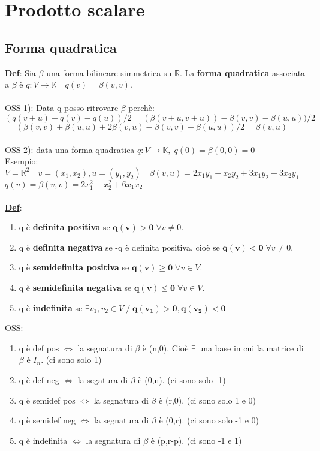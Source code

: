 \documentclass[12pt]{article}
\begin{document}
\section{Prodotto scalare}
\subsection{Forma quadratica}
\textbf{Def}: Sia $\beta$ una forma bilineare simmetrica su $\mathbb{R}$. La \textbf{forma quadratica} associata a $\beta$ è $q:V\longrightarrow \mathbb{K}\quad q(v) = \beta(v,v)$.\\\\
\underline{OSS 1)}: Data q posso ritrovare $\beta$ perchè:\\
$(q(v+u)-q(v)-q(u))/2 = (\beta(v+u,v+u))-\beta(v,v)-\beta(u,u))/2$\\
$=(\beta(v,v)+\beta(u,u) +2\beta(v,u)-\beta(v,v) - \beta(u,u))/2 = \beta(v,u)$\\\\
\underline{OSS 2)}: data una forma quadratica $q : V \longrightarrow \mathbb{K},\; q(\underline{0}) = \beta(\underline{0}, \underline{0}) = \underline{0}$\\

\noindent Esempio:\\
$V = \mathbb{R}^2\quad v = (x_1,x_2), u=(y_1,y_2)\quad \beta(v,u) = 2x_1y_1-x_2y_2+3x_1y_2+3x_2y_1$\\
$q(v) = \beta(v,v) = 2x_1^2-x_2^2 + 6x_1x_2$\\\\
\textbf{\underline{Def}}:
\begin{enumerate}
    \item q è \textbf{definita positiva} se $\boldsymbol{q(v)>0}\; \forall v\neq 0$.
    \item q è \textbf{definita negativa} se -q è definita positiva, cioè se $\boldsymbol{q(v) < 0} \; \forall v \neq 0$.
    \item q è \textbf{semidefinita positiva} se $\boldsymbol{q(v) \ge 0}\;  \forall v\in V$.
    \item q è \textbf{semidefinita negativa} se $\boldsymbol{q(v) \le 0}\; \forall v \in V$.
    \item q è \textbf{indefinita} se $\exists v_1,v_2 \in V \;/\; \boldsymbol{q(v_1) >0 , q(v_2) <0}$
    
\end{enumerate}
\underline{OSS}:
\begin{enumerate}
    \item q è def pos $\iff$ la segnatura di $\beta$ è (n,0).
    Cioè $\exists$ una base in cui la matrice di $\beta$ è $I_n$. (ci sono solo 1)
    \item q è def neg $\iff $ la segatura di $\beta$ è (0,n). (ci sono solo -1)
    \item q è semidef pos $\iff$ la segnatura di $\beta$ è (r,0). (ci sono solo 1 e 0)
    \item q è semidef neg $\iff$ la segnatura di $\beta$ è (0,r). (ci sono solo -1 e 0)
    \item  q è indefinita $\iff$ la segnatura di $\beta$ è (p,r-p). (ci sono -1 e 1)
\end{enumerate}
\end{document}
